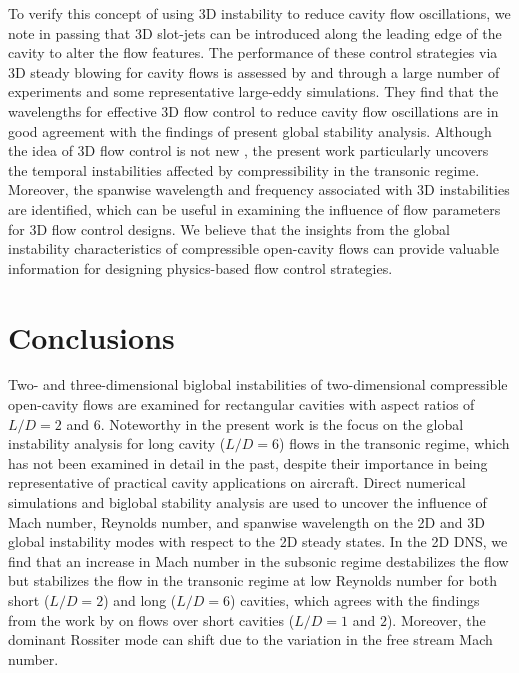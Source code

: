 \documentclass{jfm}
\begin{document}
To verify this concept of using 3D instability to reduce cavity flow oscillations, we note in passing that 3D slot-jets can be introduced along the leading edge of the cavity to alter the flow features. The performance of these control strategies via 3D steady blowing for cavity flows is assessed by \cite{Zhang:AIAA15} and \cite{George:AIAA15} through a large number of experiments and some representative large-eddy simulations. They find that the wavelengths for effective 3D flow control to reduce cavity flow oscillations are in good agreement with the findings of present global stability analysis.  
Although the idea of 3D flow control is not new \citep{ZDRAVKOVICH1981145}, the present work particularly uncovers the temporal instabilities affected by compressibility in the transonic regime. Moreover, the spanwise wavelength and frequency associated with 3D instabilities are identified, which can be useful in examining the influence of flow parameters for 3D flow control designs.
We believe that the insights from the global instability characteristics of compressible open-cavity flows can provide valuable information for designing physics-based flow control strategies.

\section{Conclusions}
\label{sec:summary}


Two- and three-dimensional biglobal instabilities of two-dimensional compressible open-cavity flows are examined for rectangular cavities with aspect ratios of $L/D=2$ and 6. %
Noteworthy in the present work is the focus on the %
global instability analysis for long cavity ($L/D=6$) flows in the transonic regime, which has not been examined in detail in the past, despite their importance in being %
representative of practical cavity applications on aircraft. Direct numerical simulations and biglobal stability analysis are used to uncover the influence of Mach number, Reynolds number, and spanwise wavelength on the 2D and 3D global instability modes with respect to the 2D steady states. In the 2D DNS, we find that an increase in Mach number in the subsonic regime  destabilizes the flow but stabilizes the flow in the transonic regime at low Reynolds number for both short ($L/D=2$) and long ($L/D=6$) cavities, which agrees with the findings from the work by \cite{Yamouni:JFM13} on flows over short cavities ($L/D=1$ and $2$).  %
Moreover, the dominant Rossiter mode can shift due to the variation in the free stream Mach number. 
\end{document}
